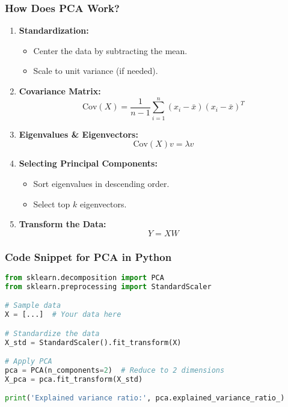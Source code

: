\documentclass[aspectratio=169]{beamer}
\begin{document}
\begin{frame}
    \frametitle{How Does PCA Work?}
    \begin{enumerate}
        \item \textbf{Standardization:}
            \begin{itemize}
                \item Center the data by subtracting the mean.
                \item Scale to unit variance (if needed).
            \end{itemize}
        
        \item \textbf{Covariance Matrix:}
            \begin{equation}
                \text{Cov}(X) = \frac{1}{n-1} \sum_{i=1}^{n} (x_i - \bar{x})(x_i - \bar{x})^T
            \end{equation}
        
        \item \textbf{Eigenvalues & Eigenvectors:}
            \begin{equation}
                \text{Cov}(X)v = \lambda v
            \end{equation}

        \item \textbf{Selecting Principal Components:}
            \begin{itemize}
                \item Sort eigenvalues in descending order.
                \item Select top \( k \) eigenvectors.
            \end{itemize}

        \item \textbf{Transform the Data:}
            \begin{equation}
                Y = XW
            \end{equation}
    \end{enumerate}
\end{frame}

\begin{frame}[fragile]
    \frametitle{Code Snippet for PCA in Python}
    \begin{lstlisting}[language=Python]
from sklearn.decomposition import PCA
from sklearn.preprocessing import StandardScaler

# Sample data
X = [...]  # Your data here

# Standardize the data
X_std = StandardScaler().fit_transform(X)

# Apply PCA
pca = PCA(n_components=2)  # Reduce to 2 dimensions
X_pca = pca.fit_transform(X_std)

print('Explained variance ratio:', pca.explained_variance_ratio_)
    \end{lstlisting}
\end{frame}
\end{document}
